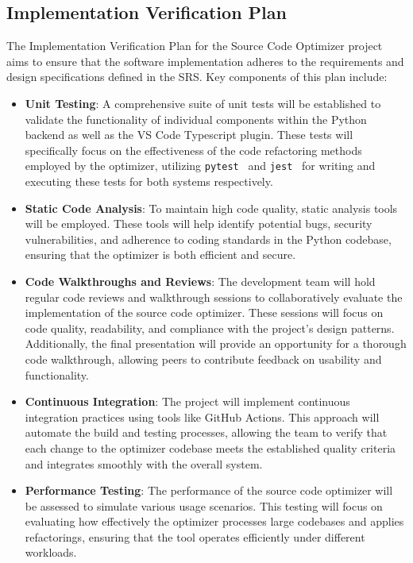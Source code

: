 \documentclass[12pt, titlepage]{article}
\begin{document}
\subsection{Implementation Verification Plan}

The Implementation Verification Plan for the Source Code Optimizer
project aims to ensure that the software implementation adheres to
the requirements and design specifications defined in the SRS. Key
components of this plan include:

\begin{itemize}
  \item \textbf{Unit Testing}: A comprehensive suite of unit tests
    will be established to validate the functionality of individual
    components within the Python backend as well as the VS Code Typescript plugin. These tests will specifically
    focus on the effectiveness of the code refactoring methods
    employed by the optimizer, utilizing
    \texttt{pytest}~\cite{pytest} and \texttt{jest}~\cite{jest} for writing and executing these tests for both systems respectively.

  \item \textbf{Static Code Analysis}: To maintain high code quality,
    static analysis tools will be employed. These tools will help
    identify potential bugs, security vulnerabilities, and adherence
    to coding standards in the Python codebase, ensuring that the
    optimizer is both efficient and secure.

  \item \textbf{Code Walkthroughs and Reviews}: The development team
    will hold regular code reviews and walkthrough sessions to
    collaboratively evaluate the implementation of the source code
    optimizer. These sessions will focus on code quality,
    readability, and compliance with the project’s design patterns.
    Additionally, the final presentation will provide an opportunity
    for a thorough code walkthrough, allowing peers to contribute
    feedback on usability and functionality.

  \item \textbf{Continuous Integration}: The project will implement
    continuous integration practices using tools like GitHub Actions.
    This approach will automate the build and testing processes,
    allowing the team to verify that each change to the optimizer
    codebase meets the established quality criteria and integrates
    smoothly with the overall system.

  \item \textbf{Performance Testing}: The performance of the source
    code optimizer will be assessed to simulate various usage
    scenarios. This testing will focus on evaluating how effectively
    the optimizer processes large codebases and applies refactorings,
    ensuring that the tool operates efficiently under different workloads.
\end{itemize}
\end{document}
